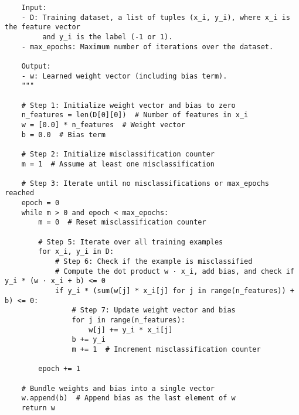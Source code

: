 \begin{itemize}
\begin{verbatim}
    Input:
    - D: Training dataset, a list of tuples (x_i, y_i), where x_i is the feature vector 
         and y_i is the label (-1 or 1).
    - max_epochs: Maximum number of iterations over the dataset.

    Output:
    - w: Learned weight vector (including bias term).
    """
    
    # Step 1: Initialize weight vector and bias to zero
    n_features = len(D[0][0])  # Number of features in x_i
    w = [0.0] * n_features  # Weight vector
    b = 0.0  # Bias term
    
    # Step 2: Initialize misclassification counter
    m = 1  # Assume at least one misclassification
    
    # Step 3: Iterate until no misclassifications or max_epochs reached
    epoch = 0
    while m > 0 and epoch < max_epochs:
        m = 0  # Reset misclassification counter
        
        # Step 5: Iterate over all training examples
        for x_i, y_i in D:
            # Step 6: Check if the example is misclassified
            # Compute the dot product w · x_i, add bias, and check if y_i * (w · x_i + b) <= 0
            if y_i * (sum(w[j] * x_i[j] for j in range(n_features)) + b) <= 0:
                # Step 7: Update weight vector and bias
                for j in range(n_features):
                    w[j] += y_i * x_i[j]
                b += y_i
                m += 1  # Increment misclassification counter
        
        epoch += 1
    
    # Bundle weights and bias into a single vector
    w.append(b)  # Append bias as the last element of w
    return w
\end{verbatim}
    
\end{itemize}